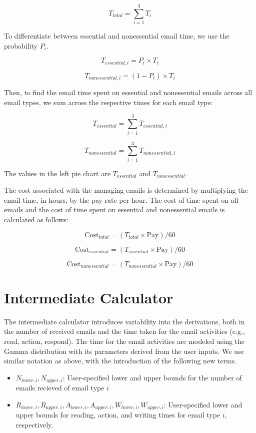\documentclass[
  reportpaper,
  DIV=11,
  numbers=noendperiod]{scrartcl}
\providecommand{\tightlist}{%
  \setlength{\itemsep}{0pt}\setlength{\parskip}{0pt}}\usepackage{longtable,booktabs,array}
\begin{document}
\[ T_{total} = \sum_{i=1}^{3} T_i \]

To differentiate between essential and nonessential email time, we use
the probability \(P_i\).

\[ T_{essential,i} = P_i \times T_i \]

\[ T_{nonessential,i} = (1 - P_i) \times T_i \]

Then, to find the email time spent on essential and nonessential emails
across all email types, we sum across the respective times for each
email type:

\[ T_{essential} = \sum_{i=1}^{3} T_{essential,i} \]

\[ T_{nonessential} = \sum_{i=1}^{3} T_{nonessential,i} \]

The values in the left pie chart are \(T_{essential}\) and
\(T_{nonessential}\).

The cost associated with the managing emails is determined by
multiplying the email time, in hours, by the pay rate per hour. The cost
of time spent on all emails and the cost of time spent on essential and
nonessential emails is calculated as follows:

\[ \text{Cost}_{total} = ( T_{total} \times \text{Pay} ) / 60\]

\[ \text{Cost}_{essential} = ( T_{essential} \times \text{Pay}  ) / 60\]

\[ \text{Cost}_{nonessential} = ( T_{nonessential} \times \text{Pay}  ) / 60\]

\newpage{}

\section{Intermediate Calculator}\label{intermediate-calculator}

The intermediate calculator introduces variability into the derivations,
both in the number of received emails and the time taken for the email
activities (e.g., read, action, respond). The time for the email
activities are modeled using the Gamma distribution with its parameters
derived from the user inputs. We use similar notation as above, with the
introduction of the following new terms.

\begin{itemize}
\tightlist
\item
  \(N_{lower,i}, N_{upper,i}\): User-specified lower and upper bounds
  for the number of emails recieved of email type \(i\)
\item
  \(R_{lower,i}, R_{upper,i}, A_{lower,i}, A_{upper,i}, W_{lower,i}, W_{upper,i}\):
  User-specified lower and upper bounds for reading, action, and writing
  times for email type \(i\), respectively.
\end{itemize}
\end{document}
